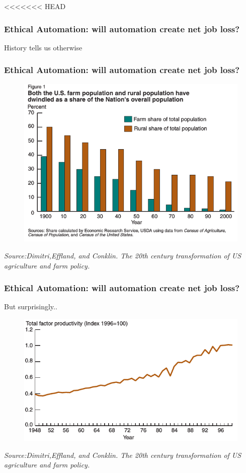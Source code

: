 \begin{frame}
<<<<<<< HEAD
  \frametitle{ Ethical Automation: will automation create net job loss?}
  {\Large History tells us otherwise}
\end{frame}

\begin{frame}
	\frametitle{Ethical Automation: will automation create net job loss?}
	
	\begin{figure}[bht]
	\centering
	\includegraphics[scale=0.5]{diagrams/agriculture-data}
	\end{figure}
	\textit{Source:Dimitri,Effland, and Conklin. The 20th century transformation of US agriculture and farm policy.}
	
\end{frame}

\begin{frame}
	\frametitle{Ethical Automation: will automation create net job loss? }
	{\Large But surprisingly..}
	\begin{figure}[bht]
	\centering
	\includegraphics[scale= 0.4]{diagrams/agriculture-production}
	\end{figure}
	\textit{Source:Dimitri,Effland, and Conklin. The 20th century transformation of US agriculture and farm policy.}
\end{frame}


